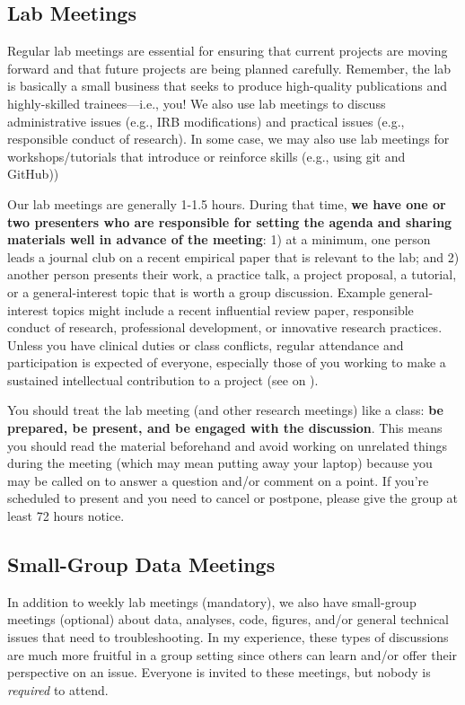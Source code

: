 \documentclass[letterpaper,11pt,oneside]{memoir}
\begin{document}
\subsection{Lab Meetings}
Regular lab meetings are essential for ensuring that current projects are moving forward and that future projects are being planned carefully. Remember, the lab is basically a small business that seeks to produce high-quality publications and highly-skilled trainees---i.e., you! We also use lab meetings to discuss administrative issues (e.g., IRB modifications) and practical issues (e.g., responsible conduct of research). In some case, we may also use lab meetings for workshops/tutorials that introduce or reinforce skills (e.g., using git and GitHub))

Our lab meetings are generally 1-1.5 hours. During that time, \textbf{we have one or two presenters who are responsible for setting the agenda and sharing materials well in advance of the meeting}: 1) at a minimum, one person leads a journal club on a recent empirical paper that is relevant to the lab; and 2) another person presents their work, a practice talk, a project proposal, a tutorial, or a general-interest topic that is worth a group discussion. Example general-interest topics might include a recent influential review paper, responsible conduct of research, professional development, or innovative research practices. Unless you have clinical duties or class conflicts, regular attendance and participation is expected of everyone, especially those of you working to make a sustained intellectual contribution to a project (see  on ).

You should treat the lab meeting (and other research meetings) like a class: \textbf{be prepared, be present, and be engaged with the discussion}. This means you should read the material beforehand and avoid working on unrelated things during the meeting (which may mean putting away your laptop) because you may be called on to answer a question and/or comment on a point. If you're scheduled to present and you need to cancel or postpone, please give the group at least 72 hours notice. 

\subsection{Small-Group Data Meetings}
In addition to weekly lab meetings (mandatory), we also have small-group meetings (optional) about data, analyses, code, figures, and/or general technical issues that need to troubleshooting. In my experience, these types of discussions are much more fruitful in a group setting since others can learn and/or offer their perspective on an issue. Everyone is invited to these meetings, but nobody is \textit{required} to attend. 
\end{document}
